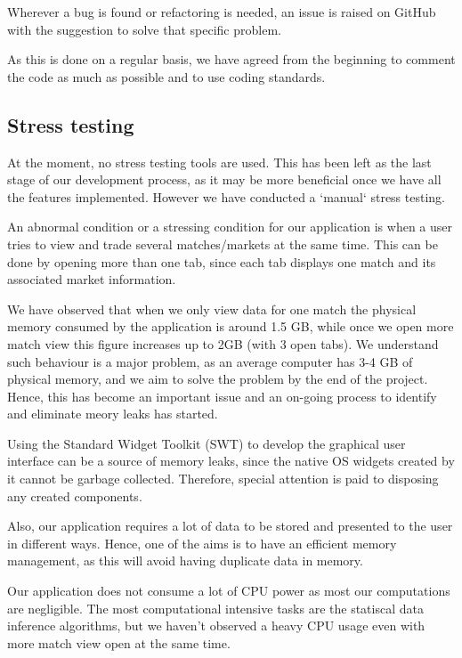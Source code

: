 \documentclass[10pt]{article}
\begin{document}
Wherever a bug is found or refactoring is needed, an issue is raised on GitHub with the suggestion to solve that specific problem.

As this is done on a regular basis, we have agreed from the beginning to comment the code as much as possible and to use coding standards.

\subsection{Stress testing}

At the moment, no stress testing tools are used. This has been left as the last stage of our development process, as it may be more beneficial once we have all the features implemented. However we have conducted a `manual` stress testing.

An abnormal condition or a stressing condition for our application is when a user tries to view and trade several matches/markets at the same time. This can be done by opening more than one tab, since each tab displays one match and its associated market information.

We have observed that when we only view data for one match the physical memory consumed by the application is around 1.5 GB, while once we open more match view this figure increases up to 2GB (with 3 open tabs). We understand such behaviour is a major problem, as an average computer has 3-4 GB of physical memory, and we aim to solve the problem by the end of the project. Hence, this has become an important issue and an on-going process to identify and eliminate meory leaks has started.

Using the Standard Widget Toolkit (SWT) to develop the graphical user interface can be a source of memory leaks, since the native OS widgets created by it cannot be garbage collected. Therefore, special attention is paid to disposing any created components.

Also, our application requires a lot of data to be stored and presented to the user in different ways. Hence, one of the aims is to have an efficient memory management, as this will avoid having duplicate data in memory.

Our application does not consume a lot of CPU power as most our computations are negligible. The most computational intensive tasks are the statiscal data inference algorithms, but we haven’t observed a heavy CPU usage even with more match view open at the same time.

\clearpage
\end{document}
